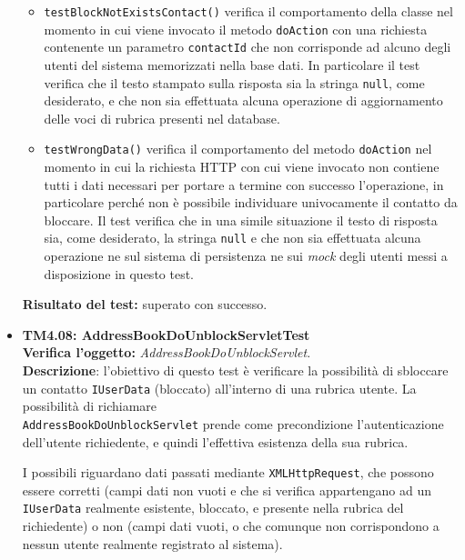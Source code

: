 \begin{itemize}
\begin{itemize}
\item \texttt{testBlockNotExistsContact()} verifica il comportamento della classe nel momento in cui viene invocato il metodo \texttt{doAction} con una richiesta contenente un parametro \texttt{contactId} che non corrisponde ad alcuno degli utenti del sistema memorizzati nella base dati. In particolare il test verifica che il testo stampato sulla risposta sia la stringa \texttt{null}, come desiderato, e che non sia effettuata alcuna operazione di aggiornamento delle voci di rubrica presenti nel database.

\item \texttt{testWrongData()} verifica il comportamento del metodo \texttt{doAction} nel momento in cui la richiesta HTTP con cui viene invocato non contiene tutti i dati necessari per portare a termine con successo l'operazione, in particolare perché non è possibile individuare univocamente il contatto da bloccare. Il test verifica che in una simile situazione il testo di risposta sia, come desiderato, la stringa \texttt{null} e che non sia effettuata alcuna operazione ne sul sistema di persistenza ne sui \textit{mock} degli utenti messi a disposizione in questo test.
\end{itemize}
\textbf{Risultato del test:} superato con successo.

\item \textbf{TM4.08: AddressBookDoUnblockServletTest}\\
\textbf{Verifica l'oggetto:} \textit{AddressBookDoUnblockServlet}.\\
\textbf{Descrizione}: l'obiettivo di questo test è verificare la possibilità di sbloccare un contatto \texttt{IUserData} (bloccato) all'interno di una rubrica utente. La possibilità di richiamare\\ \texttt{AddressBookDoUnblockServlet} prende come precondizione l'autenticazione dell'utente richiedente, e quindi l'effettiva esistenza della sua rubrica.

I possibili  riguardano dati passati mediante \texttt{XMLHttpRequest}, che possono essere corretti (campi dati non vuoti e che si verifica appartengano ad un \texttt{IUserData} realmente esistente, bloccato, e presente nella rubrica del richiedente) o non (campi dati vuoti, o che comunque non corrispondono a nessun utente realmente registrato al sistema).


\end{itemize}
